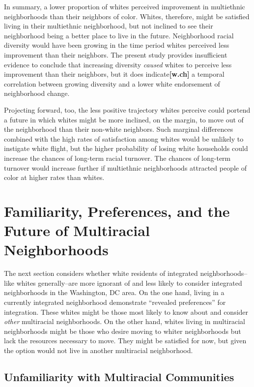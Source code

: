 \documentclass{baderart}
\begin{document}
In summary, a lower proportion of whites perceived improvement in multiethnic neighborhoods than their neighbors of color. Whites, therefore, might be satisfied living in their multiethnic neighborhood, but not inclined to see their neighborhood being a better place to live in the future. Neighborhood racial diversity would have been growing in the time period whites perceived less improvement than their neighbors. The present study provides insufficient evidence to conclude that increasing diversity \emph{caused} whites to perceive less improvement than their neighbors, but it does indicate\textbf{{[}w.ch{]}} a temporal correlation between growing diversity and a lower white endorsement of neighborhood change.

Projecting forward, too, the less positive trajectory whites perceive could portend a future in which whites might be more inclined, on the margin, to move out of the neighborhood than their non-white neighbors. Such marginal differences combined with the high rates of satisfaction among whites would be unlikely to instigate white flight, but the higher probability of losing white households could increase the chances of long-term racial turnover. The chances of long-term turnover would increase further if multiethnic neighborhoods attracted people of color at higher rates than whites.

\section{Familiarity, Preferences, and the Future of Multiracial Neighborhoods}

The next section considers whether white residents of integrated neighborhoods--like whites generally--are more ignorant of and less likely to consider integrated neighborhoods in the Washington, DC area. On the one hand, living in a currently integrated neighborhood demonstrate ``revealed preferences'' for integration. These whites might be those most likely to know about and consider \emph{other} multiracial neighborhoods. On the other hand, whites living in multiracial neighborhoods might be those who desire moving to whiter neighborhoods but lack the resources necessary to move. They might be satisfied for now, but given the option would not live in another multiracial neighborhood.

\subsection{Unfamiliarity with Multiracial Communities}\label{unfamiliarity-with-multiracial-communities}
\end{document}
